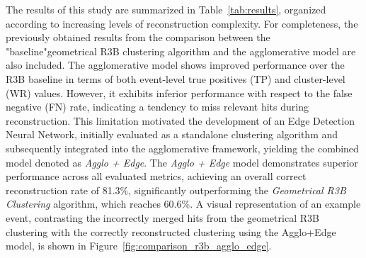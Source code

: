 \documentclass[final,5p,times,twocolumn]{elsarticle}
\begin{document}
The results of this study are summarized in Table~\ref{tab:results}, organized according to increasing levels of reconstruction complexity. For completeness, the previously obtained results from the comparison between the "baseline"geometrical R3B clustering algorithm and the agglomerative model are also included.\newline
The agglomerative model shows improved performance over the R3B baseline in terms of both event-level true positives (TP) and cluster-level (WR) values. However, it exhibits inferior performance with respect to the false negative (FN) rate, indicating a tendency to miss relevant hits during reconstruction. This limitation motivated the development of an Edge Detection Neural Network, initially evaluated as a standalone clustering algorithm and subsequently integrated into the agglomerative framework, yielding the combined model denoted as \textit{Agglo + Edge}.\newline
The \textit{Agglo + Edge} model demonstrates superior performance across all evaluated metrics, achieving an overall correct reconstruction rate of 81.3\%, significantly outperforming the \textit{Geometrical R3B Clustering} algorithm, which reaches 60.6\%.\newline
A visual representation of an example event, contrasting the incorrectly merged hits from the geometrical R3B clustering with the correctly reconstructed clustering using the Agglo+Edge model, is shown in Figure~\ref{fig:comparison_r3b_agglo_edge}.\newline
\end{document}
